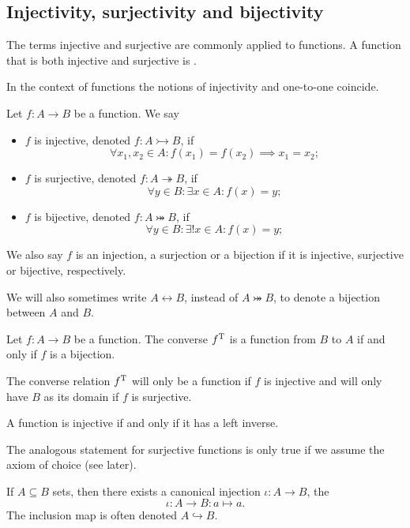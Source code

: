 \subsection{Injectivity, surjectivity and bijectivity}
\begin{definition}
The terms injective and surjective are commonly applied to functions. A function that is both injective and surjective is .
\end{definition}
In the context of functions the notions of injectivity and one-to-one coincide.
\begin{lemma}
Let $f:A\to B$ be a function. We say
\begin{itemize}
\item $f$ is injective, denoted $f: A\rightarrowtail B$, if
\[ \forall x_1,x_2\in A: f(x_1) = f(x_2) \implies x_1 = x_2; \]
\item $f$ is surjective, denoted $f: A\twoheadrightarrow B$, if
\[ \forall y\in B: \exists x\in A: f(x) = y; \]
\item $f$ is bijective, denoted $f: A\twoheadrightarrowtail B$, if
\[ \forall y\in B: \exists! x\in A: f(x) = y; \]
\end{itemize}
We also say $f$ is an injection, a surjection or a bijection if it is injective, surjective or bijective, respectively.

We will also sometimes write $A \leftrightarrow B$, instead of $A\twoheadrightarrowtail B$, to denote a bijection between $A$ and $B$.
\end{lemma}
\begin{lemma}
Let $f:A\to B$ be a function. The converse $f^{\mathrm{T}}$ is a function from $B$ to $A$ \textup{if and only if} $f$ is a bijection.
\end{lemma}
The converse relation $f^{\mathrm{T}}$ will only be a function if $f$ is injective and will only have $B$ as its domain if $f$ is surjective.

\begin{lemma} \label{lemma:injectiveInverse}
A function is injective \textup{if and only if} it has a left inverse.
\end{lemma}
The analogous statement for surjective functions is only true if we assume the axiom of choice (see later).

\begin{lemma}
If $A\subseteq B$ sets, then there exists a canonical injection $\iota: A\to B$, the 
\[ \iota: A\to B: a\mapsto a. \]
The inclusion map is often denoted $A\hookrightarrow B$.
\end{lemma}


